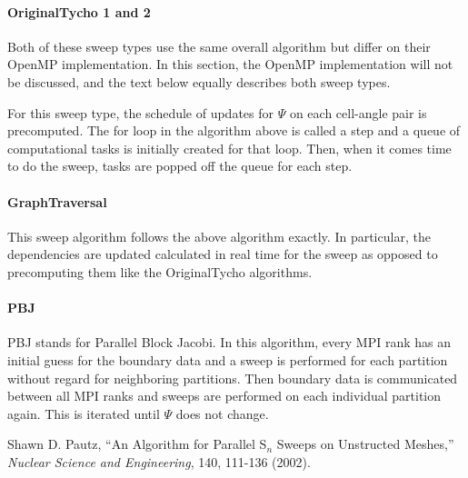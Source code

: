 \documentclass[12pt,letterpaper]{article}
\begin{document}
\paragraph{OriginalTycho 1 and 2}
Both of these sweep types use the same overall algorithm but differ on their OpenMP implementation.
In this section, the OpenMP implementation will not be discussed, and the text below equally describes both sweep types.

For this sweep type, the schedule of updates for $\Psi$ on each cell-angle pair is precomputed.
The for loop in the algorithm above is called a step and a queue of computational tasks is initially created for that loop.
Then, when it comes time to do the sweep, tasks are popped off the queue for each step.

\paragraph{GraphTraversal}
This sweep algorithm follows the above algorithm exactly.
In particular, the dependencies are updated calculated in real time for the sweep as opposed to precomputing them like the OriginalTycho algorithms.


\paragraph{PBJ}
PBJ stands for Parallel Block Jacobi.
In this algorithm, every MPI rank has an initial guess for the boundary data and a sweep is performed for each partition without regard for neighboring partitions.
Then boundary data is communicated between all MPI ranks and sweeps are performed on each individual partition again.
This is iterated until $\Psi$ does not change.



\begin{thebibliography}{1}

   Shawn D. Pautz, ``An Algorithm for Parallel S$_n$ Sweeps on Unstructed Meshes,'' {\em Nuclear Science and Engineering}, 140, 111-136 (2002).

  

\end{thebibliography}
\end{document}
